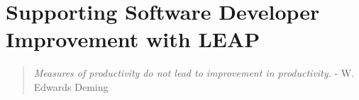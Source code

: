 
\chapter{Supporting Software Developer Improvement with LEAP}
\label{sec:LEAP}
\begin{quote}
{\em Measures of productivity do not lead to improvement in productivity.} -
W. Edwards Deming
\end{quote}




 
